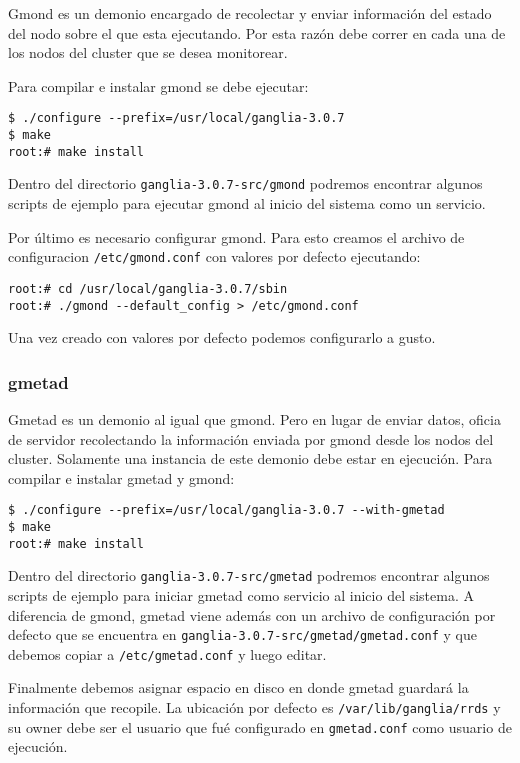 \documentclass[a4paper,10pt,spanish]{article}
\begin{document}
Gmond es un demonio encargado de recolectar y enviar informaci\'{o}n del estado del nodo sobre el que esta ejecutando. Por esta raz\'{o}n debe correr en cada una de los nodos del cluster que se desea monitorear.

Para compilar e instalar gmond se debe ejecutar:

\begin{verbatim}
$ ./configure --prefix=/usr/local/ganglia-3.0.7
$ make
root:# make install
\end{verbatim}

Dentro del directorio \mbox{\texttt{ganglia-3.0.7-src/gmond}} podremos encontrar algunos scripts de ejemplo para ejecutar gmond al inicio del sistema como un servicio. 

Por \'{u}ltimo es necesario configurar gmond. Para esto creamos el archivo de configuracion \mbox{\texttt{/etc/gmond.conf}} con valores por defecto ejecutando:

\begin{verbatim}
root:# cd /usr/local/ganglia-3.0.7/sbin
root:# ./gmond --default_config > /etc/gmond.conf
\end{verbatim}

Una vez creado con valores por defecto podemos configurarlo a gusto.

\subsubsection{gmetad}

Gmetad es un demonio al igual que gmond. Pero en lugar de enviar datos, oficia de servidor recolectando la informaci\'{o}n enviada por gmond desde los nodos del cluster. Solamente una instancia de este demonio debe
estar en ejecuci\'{o}n. Para compilar e instalar gmetad y gmond:

\begin{verbatim}
$ ./configure --prefix=/usr/local/ganglia-3.0.7 --with-gmetad 
$ make
root:# make install
\end{verbatim}

Dentro del directorio \mbox{\texttt{ganglia-3.0.7-src/gmetad}} podremos encontrar algunos scripts de ejemplo para iniciar gmetad como servicio al inicio del sistema. A diferencia de gmond, gmetad viene adem\'{a}s con un archivo de configuraci\'{o}n por defecto que se encuentra en \mbox{\texttt{ganglia-3.0.7-src/gmetad/gmetad.conf}} y que debemos copiar a \mbox{\texttt{/etc/gmetad.conf}} y luego editar.

Finalmente debemos asignar espacio en disco en donde gmetad guardar\'{a} la informaci\'{o}n que recopile. La ubicaci\'{o}n por defecto es \mbox{\texttt{/var/lib/ganglia/rrds}} y su owner debe ser el usuario que fu\'{e} configurado en \texttt{gmetad.conf} como usuario de ejecuci\'{o}n.
\end{document}
